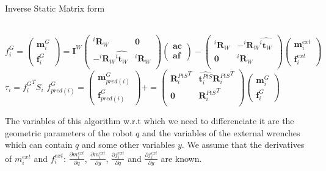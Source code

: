 \begin{algorithm}
  \caption{Inverse Static Matrix form}
\label{ISmatrix}
\begin{algorithmic}
  \\
  $f^G_i =
  \begin{pmatrix}
    \mathbf{m}^{G}_i \\ \mathbf{f}^{G}_i
  \end{pmatrix}
  =
  \mathbf{I}^W
  \begin{pmatrix}
    {{}^i\mathbf{R}_W} & \mathbf{0} \\
    -{{}^i\mathbf{R}_W}\widehat{{}^i\mathbf{t}_W} & {{}^i\mathbf{R}_W} \\
  \end{pmatrix}
  \begin{pmatrix}
    \mathbf{ac} \\ \mathbf{af}
  \end{pmatrix}
  -
  \begin{pmatrix}
    {{}^i\mathbf{R}_W} & -{{}^i\mathbf{R}_W}\widehat{{}^i\mathbf{t}_W} \\
    \mathbf{0} & {{}^i\mathbf{R}_W} \\
  \end{pmatrix}
  \begin{pmatrix}
    \mathbf{m}^{ext}_i \\ \mathbf{f}^{ext}_i
  \end{pmatrix}
  $
  \EndFor{}
  \State$\tau_i = {f^G_i}^T S_i$
  \State$f^G_{pred(i)} =
  \begin{pmatrix}
    \mathbf{m}^{G}_{pred(i)} \\ \mathbf{f}^{G}_{pred(i)}
  \end{pmatrix}
  +=
  \begin{pmatrix}
    {\mathbf{R}^{PtS}_i}^T & \widehat{\mathbf{t}^{PtS}_i}{\mathbf{R}^{PtS}_i}^T \\
    \mathbf{0} & {\mathbf{R}^{PtS}_i}^T \\
  \end{pmatrix}
  \begin{pmatrix}
    \mathbf{m}^{G}_i \\ \mathbf{f}^{G}_i
  \end{pmatrix}
  $
  \EndIf{}
  \EndFor{}
\end{algorithmic}
\end{algorithm}

The variables of this algorithm w.r.t which we need to differenciate it are the geometric parameters of the robot $q$ and the variables of the external wrenches which can contain $q$ and some other variables $y$.
We assume that the derivatives of $m_i^{ext}$ and $f_i^{ext}$: $\frac{\partial m_i^{ext}}{\partial q}$, $\frac{\partial m_i^{ext}}{\partial y}$, $\frac{\partial f_i^{ext}}{\partial q}$ and $\frac{\partial f_i^{ext}}{\partial y}$ are known.

